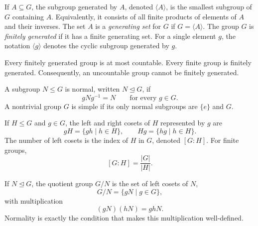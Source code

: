     \begin{definition}\label{pp:generated}
        If $A\subseteq G$, the subgroup generated by $A$, denoted
        $\langle A\rangle$, is the smallest subgroup of $G$ containing $A$.
        Equivalently, it consists of all finite products of elements of $A$ and
        their inverses. The set $A$ is a \emph{generating set} for $G$ if
        $G=\langle A\rangle$. The group $G$ is \emph{finitely generated} if
        it has a finite generating set. For a single element $g$, the notation
        $\langle g\rangle$ denotes the cyclic subgroup generated by $g$.
    \end{definition}

    \begin{proposition}\label{pp:countable}
        Every finitely generated group is at most countable. Every finite group
        is finitely generated. Consequently, an uncountable group cannot be
        finitely generated.
    \end{proposition}

    \begin{definition}
        A subgroup $N\leq G$ is normal, written $N\trianglelefteq G$, if
        \[
            gNg^{-1}=N
            \qquad
            \text{for every }g\in G.
        \]
        A nontrivial group $G$ is simple if its only normal subgroups are
        $\{e\}$ and $G$.
    \end{definition}


    \begin{definition}
        If $H\leq G$ and $g\in G$, the left and right cosets of $H$ represented
        by $g$ are
        \[
            gH=\{gh\mid h\in H\},
            \qquad
            Hg=\{hg\mid h\in H\}.
        \]
        The number of left cosets is the index of $H$ in $G$, denoted
        $[G:H]$. For finite groups,
        \[
            [G:H]=\frac{|G|}{|H|}.
        \]
    \end{definition}

    \begin{definition}
        If $N\trianglelefteq G$, the quotient group $G/N$ is the set of
        left cosets of $N$,
        \[
            G/N=\{gN\mid g\in G\},
        \]
        with multiplication
        \[
            (gN)(hN)=ghN.
        \]
        Normality is exactly the condition that makes this multiplication
        well-defined.
    \end{definition}

